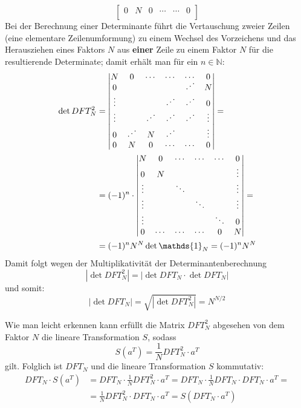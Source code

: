 \begin{flushenum}
\[\begin{bmatrix}
		0      & N      & 0      & \cdots & \cdots & 0      \\
	\end{bmatrix} \]
	Bei der Berechnung einer Determinante führt die Vertauschung zweier Zeilen
	(eine elementare Zeilenumformung) zu einem Wechsel des Vorzeichens und das
	Herausziehen eines Faktors $N$ aus {\bf einer} Zeile zu einem Faktor $N$ für die
	resultierende Determinate; damit erhält man für ein $n \in \mathbb{N}$:
	\begin{equation*}
	\begin{split}
	\det DFT_N^2 &= \begin{vmatrix}
		N      & 0      & \cdots & \cdots & \cdots & 0      \\
		0      &        &        &        & \Ddots & N      \\
		\vdots &        &        & \Ddots & \Ddots & 0      \\
		\vdots &        & \Ddots & \Ddots & \Ddots & \vdots \\
		0      & \Ddots & N      & \Ddots &        & \vdots \\
		0      & N      & 0      & \cdots & \cdots & 0      \\
	\end{vmatrix} = \\
	& =  (-1)^n \cdot \begin{vmatrix}
		N      & 0      & \cdots & \cdots & \cdots & 0      \\
		0      & N      &        &        &        & \vdots \\
		\vdots &       & \ddots &        &        & \vdots \\
		\vdots &        &        & \ddots &        & \vdots \\
		\vdots &        &        &        & \ddots & 0      \\
		0      & \cdots & \cdots & \cdots & 0      & N      \\
	\end{vmatrix} = \\
	&= (-1)^n N^N \det \mathds{1}_N = (-1)^n N^N \\
	\end{split}
	\end{equation*}
	Damit folgt wegen der Multiplikativität der Determinantenberechnung
	\[ | \det DFT_N^2 | = |\det DFT_N \cdot \det DFT_N| \]
	und somit:
	\[ | \det DFT_N | = \sqrt{|\det DFT_N^2|} = N^{N/2} \]

	\item Wie man leicht erkennen kann erfüllt die Matrix $DFT_N^2$ abgesehen von dem
	Faktor $N$ die lineare Transformation $S$, sodass
	\[ S(a^T) = \frac{1}{N} DFT_N^2 \cdot a^T \]
	gilt.
	Folglich ist $DFT_N$ und die lineare Transformation $S$ kommutativ:
	\begin{equation*}
	\begin{split}
	DFT_N \cdot S(a^T) &= DFT_N \cdot \frac{1}{N}DFT_N^2 \cdot a^T = DFT_N \cdot \frac{1}{N} DFT_N \cdot DFT_N \cdot a^T = \\
	&= \frac{1}{N}DFT_N^2 \cdot DFT_N \cdot a^T = S(DFT_N \cdot a^T)
	\end{split}
	\end{equation*}


\end{flushenum}
